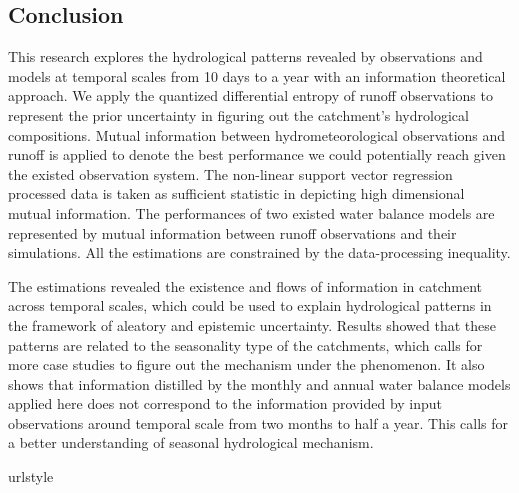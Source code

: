\documentclass[draft,wrr]{AGUTeX}
\begin{document}
\begin{article}
\section{Conclusion}
This research explores the hydrological patterns revealed by observations and models at temporal scales from 10 days to a year with an information theoretical approach. We apply the quantized differential entropy of runoff observations to represent the prior uncertainty in figuring out the catchment's hydrological compositions. Mutual information between hydrometeorological observations and runoff is applied to denote the best performance we could potentially reach given the existed observation system. The non-linear support vector regression processed data is taken as sufficient statistic in depicting  high dimensional mutual information.
The performances of two existed water balance models are represented by mutual information between runoff observations and their simulations. All the estimations are constrained by the  data-processing inequality. 

The estimations revealed the existence and flows of information in catchment across temporal scales, which could be used to explain hydrological patterns in the framework of aleatory and epistemic uncertainty. Results showed that these patterns are related to the seasonality type of the catchments, which calls for more case studies to figure out the mechanism under the phenomenon. It also shows that information distilled by the monthly and annual water balance models applied here does not correspond to the information provided by input observations around temporal scale from two months to half a year. This calls for a better understanding of seasonal hydrological mechanism.   

\begin{thebibliography}{59}
\providecommand{\natexlab}[1]{#1}
\expandafter\ifx\csname urlstyle\endcsname\relax
  \providecommand{\doi}[1]{doi:\discretionary{}{}{}#1}\else
  \providecommand{\doi}{doi:\discretionary{}{}{}\begingroup
  \urlstyle{rm}\Url}\fi



\end{thebibliography}
\end{article}
\end{document}
